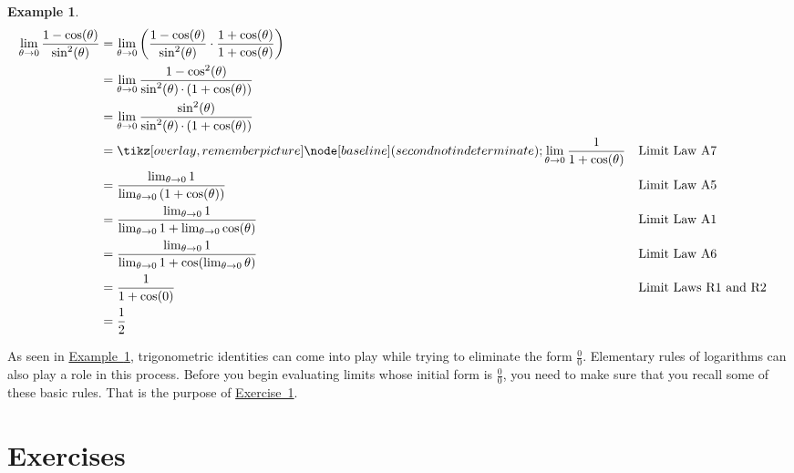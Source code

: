 \documentclass[12pt,]{book}
\theoremstyle{plain}
\theoremstyle{definition}
\newtheorem{example}[theorem]{Example}
\numberwithin{equation}{section}
\newcommand{\tikzmark}[1]{\tikz[overlay,remember picture] \node[baseline] (#1) {};}%
\newcommand{\fe}[2]{\mathop{{#1}{\left(#2\right)}}}
\begin{document}
\begin{example}\label{example-second-indeterminate}
\begin{align*}
\lim_{\theta\to0}\frac{1-\fe{\cos}{\theta}}{\fe{\sin^2}{\theta}}&=\lim_{\theta\to0}\left(\frac{1-\fe{\cos}{\theta}}{\fe{\sin^2}{\theta}}\cdot\frac{1+\fe{\cos}{\theta}}{1+\fe{\cos}{\theta}}\right)\\
&=\lim_{\theta\to0}\frac{1-\fe{\cos^2}{\theta}}{\fe{\sin^2}{\theta}\cdot\left(1+\fe{\cos}{\theta}\right)}\\
&=\lim_{\theta\to0}\frac{\fe{\sin^2}{\theta}}{\fe{\sin^2}{\theta}\cdot\left(1+\fe{\cos}{\theta}\right)}\\
&=\tikzmark{second not indeterminate}\lim_{\theta\to0}\frac{1}{1+\fe{\cos}{\theta}}&&\text{Limit Law A7}\\
&=\frac{\lim_{\theta\to0}1}{\lim_{\theta\to0}\left(1+\fe{\cos}{\theta}\right)}&&\text{Limit Law A5}\\
&=\frac{\lim_{\theta\to0}1}{\lim_{\theta\to0}1+\lim_{\theta\to0}\fe{\cos}{\theta}}&&\text{Limit Law A1}\\
&=\frac{\lim_{\theta\to0}1}{\lim_{\theta\to0}1+\fe{\cos}{\lim_{\theta\to0}\theta}}&&\text{Limit Law A6}\\
&=\frac{1}{1+\fe{\cos}{0}}&&\text{Limit Laws R1 and R2}\\
&=\frac{1}{2}
\end{align*}%
\end{example}
\par
As seen in \hyperref[example-second-indeterminate]{Example~\ref*{example-second-indeterminate}}, trigonometric identities can come into play while trying to eliminate the form \(\frac{0}{0}\). Elementary rules of logarithms can also play a role in this process. Before you begin evaluating limits whose initial form is \(\frac{0}{0}\), you need to make sure that you recall some of these basic rules. That is the purpose of \hyperref[exercise-identities-review]{Exercise~1}.%
\typeout{************************************************}
\typeout{************************************************}
\section*{Exercises}\label{exercises-7}
\end{document}
